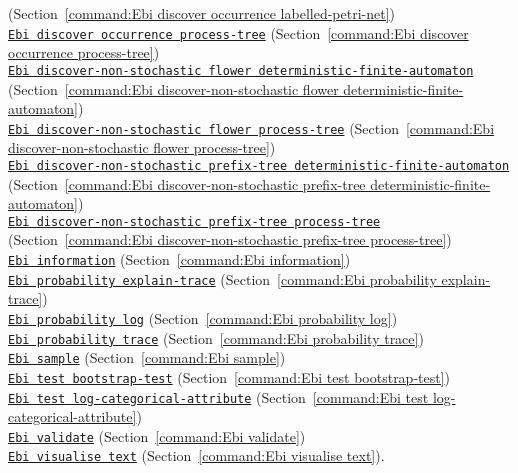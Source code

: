 {(Section~\ref{command:Ebi discover occurrence labelled-petri-net})\\\null\qquad\hyperref[command:Ebi discover occurrence process-tree]{\texttt{Ebi discover occurrence process-tree}} (Section~\ref{command:Ebi discover occurrence process-tree})\\\null\qquad\hyperref[command:Ebi discover-non-stochastic flower deterministic-finite-automaton]{\texttt{Ebi discover-non-stochastic flower deterministic-finite-automaton}} (Section~\ref{command:Ebi discover-non-stochastic flower deterministic-finite-automaton})\\\null\qquad\hyperref[command:Ebi discover-non-stochastic flower process-tree]{\texttt{Ebi discover-non-stochastic flower process-tree}} (Section~\ref{command:Ebi discover-non-stochastic flower process-tree})\\\null\qquad\hyperref[command:Ebi discover-non-stochastic prefix-tree deterministic-finite-automaton]{\texttt{Ebi discover-non-stochastic prefix-tree deterministic-finite-automaton}} (Section~\ref{command:Ebi discover-non-stochastic prefix-tree deterministic-finite-automaton})\\\null\qquad\hyperref[command:Ebi discover-non-stochastic prefix-tree process-tree]{\texttt{Ebi discover-non-stochastic prefix-tree process-tree}} (Section~\ref{command:Ebi discover-non-stochastic prefix-tree process-tree})\\\null\qquad\hyperref[command:Ebi information]{\texttt{Ebi information}} (Section~\ref{command:Ebi information})\\\null\qquad\hyperref[command:Ebi probability explain-trace]{\texttt{Ebi probability explain-trace}} (Section~\ref{command:Ebi probability explain-trace})\\\null\qquad\hyperref[command:Ebi probability log]{\texttt{Ebi probability log}} (Section~\ref{command:Ebi probability log})\\\null\qquad\hyperref[command:Ebi probability trace]{\texttt{Ebi probability trace}} (Section~\ref{command:Ebi probability trace})\\\null\qquad\hyperref[command:Ebi sample]{\texttt{Ebi sample}} (Section~\ref{command:Ebi sample})\\\null\qquad\hyperref[command:Ebi test bootstrap-test]{\texttt{Ebi test bootstrap-test}} (Section~\ref{command:Ebi test bootstrap-test})\\\null\qquad\hyperref[command:Ebi test log-categorical-attribute]{\texttt{Ebi test log-categorical-attribute}} (Section~\ref{command:Ebi test log-categorical-attribute})\\\null\qquad\hyperref[command:Ebi validate]{\texttt{Ebi validate}} (Section~\ref{command:Ebi validate})\\\null\qquad\hyperref[command:Ebi visualise text]{\texttt{Ebi visualise text}} (Section~\ref{command:Ebi visualise text}).
}
